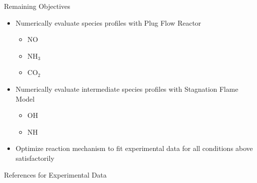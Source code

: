 \documentclass[11pt]{beamer}
\begin{document}
\begin{frame}{Remaining Objectives}
	\begin{itemize}
		\item Numerically evaluate species profiles with Plug Flow Reactor
		\begin{itemize}
			\item NO
			\item NH$_3$
			\item CO$_2$
		\end{itemize}
		\vspace{10pt}
		\item Numerically evaluate intermediate species profiles with Stagnation Flame Model
		\begin{itemize}
			\item OH
			\item NH
		\end{itemize}
		\vspace{10pt}
		\item Optimize reaction mechanism to fit experimental data for all conditions above satisfactorily
	\end{itemize}
\end{frame}

\begin{frame}{References for Experimental Data}
	\tiny
\end{frame}
\end{document}
